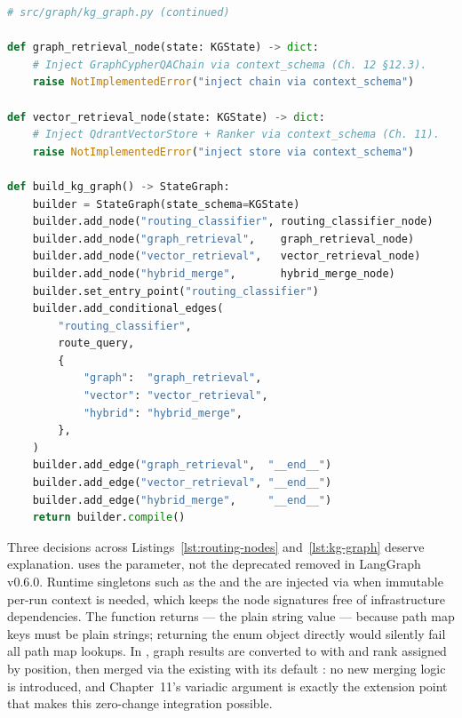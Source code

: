 \begin{lstlisting}[language=Python,
  caption={Stub retrieval nodes and KG StateGraph assembly},
  label={lst:kg-graph}]
# src/graph/kg_graph.py (continued)

def graph_retrieval_node(state: KGState) -> dict:
    # Inject GraphCypherQAChain via context_schema (Ch. 12 §12.3).
    raise NotImplementedError("inject chain via context_schema")

def vector_retrieval_node(state: KGState) -> dict:
    # Inject QdrantVectorStore + Ranker via context_schema (Ch. 11).
    raise NotImplementedError("inject store via context_schema")

def build_kg_graph() -> StateGraph:
    builder = StateGraph(state_schema=KGState)
    builder.add_node("routing_classifier", routing_classifier_node)
    builder.add_node("graph_retrieval",    graph_retrieval_node)
    builder.add_node("vector_retrieval",   vector_retrieval_node)
    builder.add_node("hybrid_merge",       hybrid_merge_node)
    builder.set_entry_point("routing_classifier")
    builder.add_conditional_edges(
        "routing_classifier",
        route_query,
        {
            "graph":  "graph_retrieval",
            "vector": "vector_retrieval",
            "hybrid": "hybrid_merge",
        },
    )
    builder.add_edge("graph_retrieval",  "__end__")
    builder.add_edge("vector_retrieval", "__end__")
    builder.add_edge("hybrid_merge",     "__end__")
    return builder.compile()
\end{lstlisting}

Three decisions across Listings~\ref{lst:routing-nodes}
and~\ref{lst:kg-graph} deserve explanation.
 uses the 
parameter, not the deprecated  removed in
LangGraph v0.6.0. Runtime singletons such as the
 and the  are injected
via  when immutable per-run context is needed, which
keeps the node signatures free of infrastructure dependencies. The
 function returns
 --- the plain string value ---
because  path map keys must be plain
strings; returning the enum object directly would silently fail all path
map lookups. In , graph results are converted
to  with  and rank assigned
by position, then merged via the existing 
with its default : no new merging logic is introduced, and
Chapter~11's variadic  argument is exactly the
extension point that makes this zero-change integration possible.

